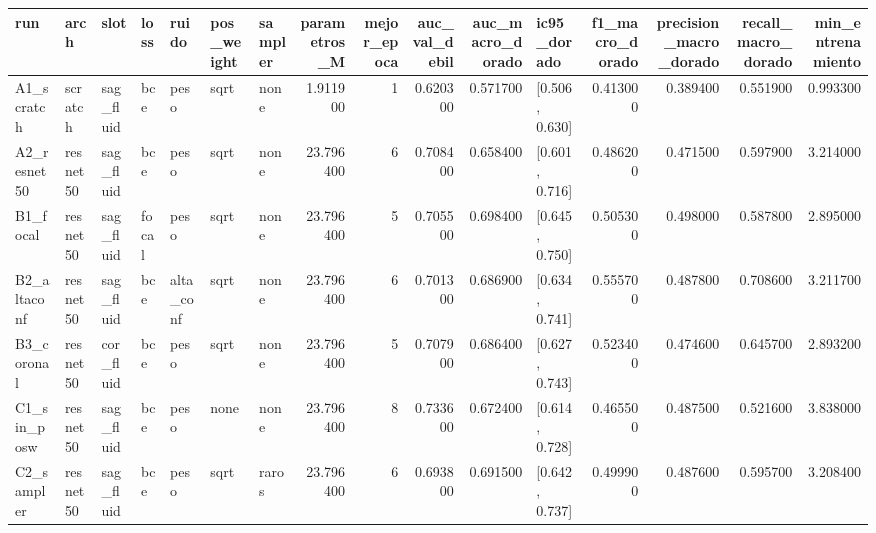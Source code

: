 \begin{tabular}{lllllllrrrrlrrrr}
\toprule
run & arch & slot & loss & ruido & pos\_weight & sampler & parametros\_M & mejor\_epoca & auc\_val\_debil & auc\_macro\_dorado & ic95\_dorado & f1\_macro\_dorado & precision\_macro\_dorado & recall\_macro\_dorado & min\_entrenamiento \\
\midrule
A1\_scratch & scratch & sag\_fluid & bce & peso & sqrt & none & 1.911900 & 1 & 0.620300 & 0.571700 & [0.506, 0.630] & 0.413000 & 0.389400 & 0.551900 & 0.993300 \\
A2\_resnet50 & resnet50 & sag\_fluid & bce & peso & sqrt & none & 23.796400 & 6 & 0.708400 & 0.658400 & [0.601, 0.716] & 0.486200 & 0.471500 & 0.597900 & 3.214000 \\
B1\_focal & resnet50 & sag\_fluid & focal & peso & sqrt & none & 23.796400 & 5 & 0.705500 & 0.698400 & [0.645, 0.750] & 0.505300 & 0.498000 & 0.587800 & 2.895000 \\
B2\_altaconf & resnet50 & sag\_fluid & bce & alta\_conf & sqrt & none & 23.796400 & 6 & 0.701300 & 0.686900 & [0.634, 0.741] & 0.555700 & 0.487800 & 0.708600 & 3.211700 \\
B3\_coronal & resnet50 & cor\_fluid & bce & peso & sqrt & none & 23.796400 & 5 & 0.707900 & 0.686400 & [0.627, 0.743] & 0.523400 & 0.474600 & 0.645700 & 2.893200 \\
C1\_sin\_posw & resnet50 & sag\_fluid & bce & peso & none & none & 23.796400 & 8 & 0.733600 & 0.672400 & [0.614, 0.728] & 0.465500 & 0.487500 & 0.521600 & 3.838000 \\
C2\_sampler & resnet50 & sag\_fluid & bce & peso & sqrt & raros & 23.796400 & 6 & 0.693800 & 0.691500 & [0.642, 0.737] & 0.499900 & 0.487600 & 0.595700 & 3.208400 \\
\bottomrule
\end{tabular}
